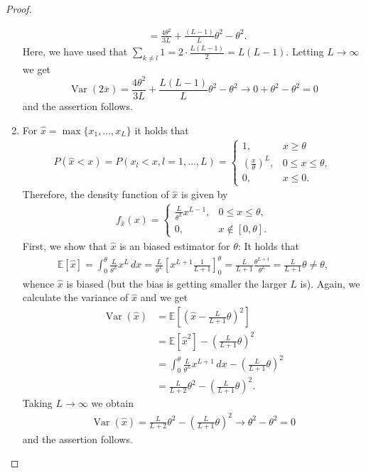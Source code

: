 \documentclass[a4paper, reqno]{amsart}
\newcommand{\E}{\mathbb E}
\theoremstyle{definition}
\numberwithin{equation}{section}
\begin{document}
\begin{proof}
\begin{enumerate}
\begin{align*}
						& = \frac{4\theta^2}{3L} + \frac{(L-1)}{L}\theta^2 - \theta^2.
				\end{align*}
				Here, we have used that $\sum_{k\not= l} 1 = 2\cdot \frac{L(L-1)}{2} = L(L-1).$
				Letting $L \to \infty$ we get 
				$$\operatorname{Var}(2\overline x) =
						\frac{4\theta^2}{3L} + \frac{L(L-1)}{L}\theta^2 - \theta^2
						\to 0 + \theta^2 - \theta^2 = 0$$
				and the assertion follows.
			\item For $\hat x = \max\{ x_1, \ldots, x_L\}$ it holds that
				\begin{align*}
					P(\hat x < x) = P(x_l < x, l=1,\ldots, L) =
						\begin{cases}
							1, & x \geq \theta \\
							\left( \frac{x}{\theta}\right)^L, & 0 \leq x \leq \theta, \\
							0, & x \leq 0.
						\end{cases}
				\end{align*}
				Therefore, the density function of $\hat x$ is given by
				\begin{align*}
					f_{\hat x}(x) = 
						\begin{cases}
							\frac{L}{\theta^L}x^{L-1}, & 0 \leq x \leq \theta, \\
							0, & x \not\in [0, \theta].
						\end{cases}
				\end{align*}
				First, we show that $\hat x$ is an biased estimator for $\theta$: It holds that
				\begin{align*}
					\E[\hat x] = \int_0^\theta \frac{L}{\theta^L}x^L\, dx 
						= \frac{L}{\theta^L}\left[ x^{L+1} \frac{1}{L+1} \right]^\theta_0
						= \frac{L}{L+1} \frac{\theta^{L+1}}{\theta^L}
						= \frac{L}{L+1}\theta \not= \theta,
				\end{align*}
				whence $\hat x$ is biased (but the bias is getting smaller the larger $L$ is). Again, we calculate the variance of $\hat x$ and we get
				\begin{align*}
					\operatorname{Var}(\hat x)
						& = \E \left[ \left(\hat x - \frac{L}{L+1}\theta \right)^2 \right] \\
						& = \E [\hat x^2] - \left( \frac{L}{L+1} \theta \right)^2 \\
						& = \int_0^\theta \frac{L}{\theta^L}x^{L+1}\, dx - \left( \frac{L}{L+1} \theta \right)^2 \\
						& = \frac{L}{L+2}\theta^2 - \left( \frac{L}{L+1} \theta \right)^2.
				\end{align*}
				Taking $L \to \infty$ we obtain
				\begin{align*}
					\operatorname{Var}(\hat x) = \frac{L}{L+2}\theta^2 - \left( \frac{L}{L+1} \theta \right)^2 \to \theta^2 - \theta^2 = 0
				\end{align*}
				and the assertion follows.
	\end{enumerate}
\end{proof}
\end{document}
